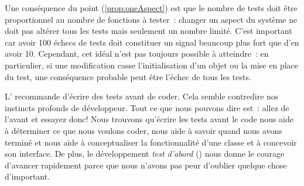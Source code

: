 \documentclass[a4paper,10pt,twoside]{book}
\begin{document}
Une conséquence du point (\ref{prop:oneAspect}) est que le nombre de tests doit être proportionnel 
au nombre de fonctions à tester~: changer un aspect du système ne doit pas altérer tous les tests 
mais seulement un nombre limité. C'est important car avoir 100 échecs de tests doit constituer 
un signal beaucoup plus fort que d'en avoir 10. Cependant, cet idéal n'est pas toujours possible 
à atteindre~: en particulier, si une modification casse l'initialisation d'un objet ou la mise 
en place du test, une conséquence probable peut être l'échec de tous les tests.

L' recommande d'écrire des tests avant de
coder. Cela semble contredire nos instincts profonds de
développeur. Tout ce que nous pouvons dire est~: allez de l'avant et
essayez donc! Nous trouvons qu'écrire les tests avant le code nous 
aide à déterminer ce que nous voulons coder, nous aide à savoir quand 
nous avons terminé et nous aide à conceptualiser la fonctionnalité 
d'une classe et à concevoir son interface.
De plus, le développement \flqq{}\emph{test d'abord}\frqq{} () 
nous donne le courage d'avancer rapidement parce que nous n'avons pas peur 
d'oublier quelque chose d'important. 

\end{document}
